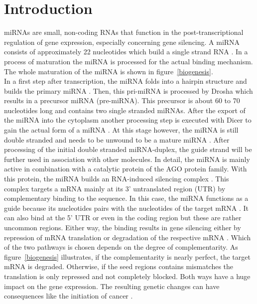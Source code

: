 \documentclass[11pt,  a4paper]{report}
\begin{document}
\newpage

\tableofcontents

\newpage 
\pagestyle{plain}





 
\vspace{1.5cm}

\newpage

\chapter{Introduction}
\label{chapter:introduction}

miRNAs are small, non-coding RNAs that function in the post-transcriptional regulation of gene expression, especially concerning gene silencing. A miRNA consists of approximately 22 nucleotides which build a single strand RNA \cite{Bartel}. In a process of maturation the miRNA is processed for the actual binding mechanism. The whole maturation of the miRNA is shown in figure~\ref{biogenesis}.\\

In a first step after transcription, the miRNA folds into a hairpin structure and builds the primary miRNA \cite{Lee}. Then, this pri-miRNA is processed by Drosha which results in a precursor miRNA (pre-miRNA). This precursor is about 60 to 70 nucleotides long and contains two single stranded miRNAs. After the export of the miRNA into the cytoplasm another processing step is executed with Dicer to gain the actual form of a miRNA \cite{Lee}. At this stage however, the miRNA is still double stranded and needs to be unwound to be a mature miRNA \cite{Macfarlane}. After processing of the initial double stranded miRNA-duplex, the guide strand will be further used in association with other molecules. In detail, the miRNA is mainly active in combination with a catalytic protein of the AGO protein family. With this protein, the miRNA builds an RNA-induced silencing complex \cite{Ha}. This complex targets a mRNA mainly at its 3' untranslated region (UTR) by complementary binding to the sequence. In this case, the miRNA functions as a guide because its nucleotides pairs with the nucleotides of the target mRNA \cite{Macfarlane}. It can also bind at the 5' UTR or even in the coding region but these are rather uncommon regions. Either way, the binding results in gene silencing either by repression of mRNA translation or degradation of the respective mRNA \cite{Enright}. Which of the two pathways is chosen depends on the degree of complementarity. As figure~\ref{biogenesis} illustrates, if the complementarity is nearly perfect, the target mRNA is degraded. Otherwise, if the seed regions contains mismatches the translation is only repressed and not completely blocked. Both ways have a huge impact on the gene expression. The resulting genetic changes can have consequences like the initiation of cancer \cite{Macfarlane}.\\
\end{document}
